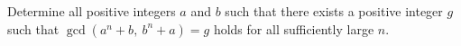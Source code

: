 Determine all positive integers $a$ and $b$ such that there exists a positive integer $g$ such that $\gcd(a^n + b,\ b^n + a) = g$ holds for all sufficiently large $n$.
